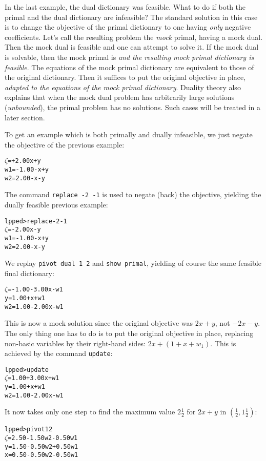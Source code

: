 \documentclass[ukenglish]{nik}
\begin{document}
In the last example, the dual dictionary was feasible. What to do if both the primal and
the dual dictionary are infeasible? The standard solution in this case is to change
the objective of the primal dictionary to one having \emph{only} negative coefficients.
Let's call the resulting problem the \emph{mock} primal, having a mock dual.
Then the mock dual is feasible and one can attempt to solve it. 
If the mock dual is solvable, then the mock primal is \emph{and the resulting
mock primal dictionary is feasible}. The equations of the mock primal dictionary
are equivalent to those of the original dictionary. Then it suffices to put the original objective
in place, \emph{adapted to the equations of the mock primal dictionary}.
Duality theory also explains that when the mock dual problem has arbitrarily large
solutions (\emph{unbounded}), the primal problem has no solutions.
Such cases will be treated in a later section.

To get an example which is both primally and dually infeasible,
we just negate the objective of the previous example:
\begin{alltt}
 \(\zeta\) =        + 2.00x + y
w1 = - 1.00 -     x + y
w2 =   2.00 -     x - y
\end{alltt}
The command \verb|replace -2 -1| is used to negate (back) the objective,
yielding the dually feasible previous example:
\begin{alltt}
lpped> replace -2 -1
 \(\zeta\)  =        - 2.00x - y
w1 = - 1.00 -     x + y
w2 =   2.00 -     x - y
\end{alltt}
We replay \verb|pivot dual 1 2| and \verb|show primal|,
yielding of course the same feasible final dictionary:
\begin{alltt}
 \(\zeta\) = - 1.00 - 3.00x - w1
 y =   1.00 +     x + w1
w2 =   1.00 - 2.00x - w1
\end{alltt}
This is now a mock solution since the original objective was $2x+y$,
not $-2x-y$. The only thing one has to do is to put the original objective in place,
replacing non-basic variables by their right-hand sides: $2x+(1+x+w_1)$.
This is achieved by the command \verb|update|:
\begin{alltt}
lpped> update
 \(\zeta\) = 1.00 + 3.00x + w1
 y = 1.00 +     x + w1
w2 = 1.00 - 2.00x - w1
\end{alltt}
It now takes only one step to find the maximum value $2\frac{1}{2}$ 
for $2x+y$ in $(\frac{1}{2},1\frac{1}{2})$:
\begin{alltt}
lpped> pivot 1 2
 \(\zeta\) = 2.50 - 1.50w2 - 0.50w1
 y = 1.50 - 0.50w2 + 0.50w1
 x = 0.50 - 0.50w2 - 0.50w1
\end{alltt}
\end{document}

